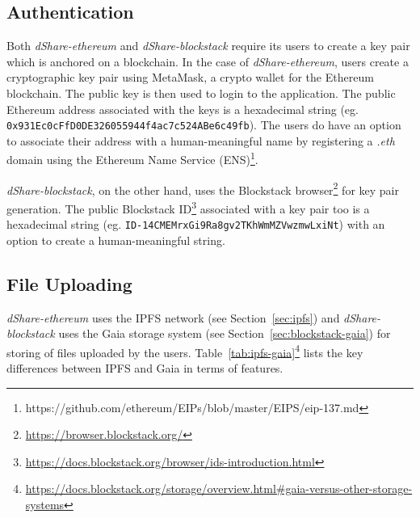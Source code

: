 		\subsection{Authentication}
			Both \textit{dShare-ethereum} and \textit{dShare-blockstack} require its users to create a key pair which is anchored on a blockchain. In the case of \textit{dShare-ethereum}, users create a cryptographic key pair using MetaMask, a crypto wallet for the Ethereum blockchain. The public key is then used to login to the application. The public Ethereum address associated with the keys is a hexadecimal string (eg. \texttt{0x931Ec0cFfD0DE326055944f4ac7c524ABe6c49fb}). The users do have an option to associate their address with a human-meaningful name by registering a \textit{.eth} domain using the Ethereum Name Service (ENS)\footnote{https://github.com/ethereum/EIPs/blob/master/EIPS/eip-137.md}.
			
			\textit{dShare-blockstack}, on the other hand, uses the Blockstack browser\footnote{\url{https://browser.blockstack.org/}} for key pair generation. The public Blockstack ID\footnote{\url{https://docs.blockstack.org/browser/ids-introduction.html}} associated with a key pair too is a hexadecimal string (eg. \texttt{ID-14CMEMrxGi9Ra8gv2TKhWmMZVwzmwLxiNt}) with an option to create a human-meaningful string.
			
		\subsection{File Uploading}
			\textit{dShare-ethereum} uses the IPFS\cite{benet2014ipfs} network (see Section~\ref{sec:ipfs}) and \textit{dShare-blockstack} uses the Gaia storage system (see Section~\ref{sec:blockstack-gaia}) for storing of files uploaded by the users. Table~\ref{tab:ipfs-gaia}\footnote{\url{https://docs.blockstack.org/storage/overview.html\#gaia-versus-other-storage-systems}} lists the key differences between IPFS and Gaia in terms of features.
		
